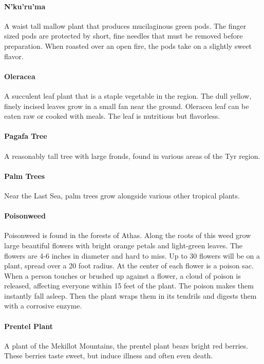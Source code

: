 \begin{multicols}{2}
\paragraph{N'ku'ru'ma}
A waist tall mallow plant that produces mucilaginous green pods. The
finger sized pods are protected by short, fine needles that must be
removed before preparation. When roasted over an open fire, the pods
take on a slightly sweet flavor.

\paragraph{Oleracea}
A succulent leaf plant that is a staple vegetable in the region. The
dull yellow, finely incised leaves grow in a small fan near the ground.
Oleracea leaf can be eaten raw or cooked with meals. The leaf is
nutritious but flavorless.

\paragraph{Pagafa Tree}
A reasonably tall tree with large fronds, found in various areas of
the Tyr region.

\paragraph{Palm Trees}
Near the Last Sea, palm trees grow alongside various other tropical plants.

\paragraph{Poisonweed}
Poisonweed is found in the forests of Athas. Along the roots of this
weed grow large beautiful flowers with bright orange petals and
light-green leaves. The flowers are 4-6 inches in diameter and hard to
miss. Up to 30 flowers will be on a plant, spread over a 20 foot
radius. At the center of each flower is a poison sac. When a person
touches or brushed up against a flower, a cloud of poison is released,
affecting everyone within 15 feet of the plant. The poison makes them
instantly fall asleep. Then the plant wraps them in its tendrils and
digests them with a corrosive enzyme.

\paragraph{Prentel Plant}
A plant of the Mekillot Mountains, the prentel plant bears bright red
berries. These berries taste sweet, but induce illness and often even death.


\end{multicols}
